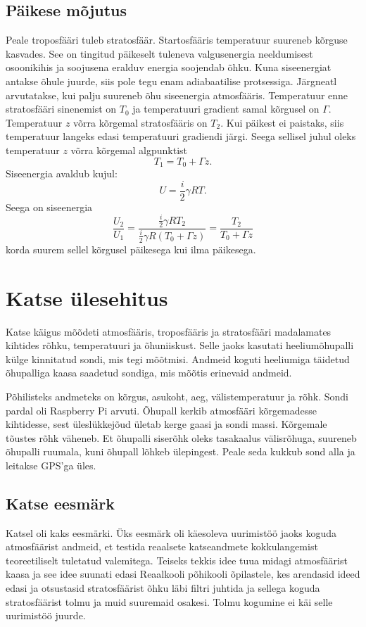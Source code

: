 \documentclass{trkut}%
\begin{document}
\section{Päikese mõjutus}
Peale troposfääri tuleb stratosfäär. Startosfääris temperatuur suureneb kõrguse kasvades. See on tingitud päikeselt tuleneva valgusenergia neeldumisest osoonikihis ja soojusena eralduv energia soojendab õhku. Kuna siseenergiat antakse õhule juurde, siis pole tegu enam adiabaatilise protsessiga. Järgneatl arvutatakse, kui palju suureneb õhu siseenergia atmosfääris. Temperatuur enne stratosfääri sinenemist on $T_0$ ja temperatuuri gradient samal kõrgusel on $\Gamma$. Temperatuur $z$ võrra kõrgemal stratosfääris on $T_2$. Kui päikest ei paistaks, siis temperatuur langeks edasi temperatuuri gradiendi järgi. Seega sellisel juhul oleks temperatuur $z$ võrra kõrgemal algpunktist
\begin{equation*}
T_1 = T_0 + \Gamma z.
\end{equation*}
Siseenergia avaldub kujul:
\begin{equation*}
U = \frac{i}{2}\gamma RT.
\end{equation*}
Seega on siseenergia 
\begin{equation*}
\frac{U_2}{U_1} = \frac{\frac{i}{2}\gamma RT_2}{\frac{i}{2}\gamma R\left(T_0 + \Gamma z\right)} = \frac{T_2}{T_0+\Gamma z}
\end{equation*}
korda suurem sellel kõrgusel päikesega kui ilma päikesega.





\chapter{Katse ülesehitus}
Katse käigus mõõdeti atmosfääris, troposfääris ja stratosfääri madalamates kihtides rõhku, temperatuuri ja õhuniiskust. Selle jaoks kasutati heeliumõhupalli külge kinnitatud sondi, mis tegi mõõtmisi. Andmeid koguti heeliumiga täidetud õhupalliga kaasa saadetud sondiga, mis mõõtis erinevaid andmeid.

Põhilisteks andmeteks on kõrgus, asukoht, aeg, välistemperatuur ja rõhk. Sondi pardal oli Raspberry Pi arvuti. Õhupall kerkib atmosfääri kõrgemadesse kihtidesse, sest üleslükkejõud ületab kerge gaasi ja sondi massi. Kõrgemale tõustes rõhk väheneb. Et õhupalli siserõhk oleks tasakaalus välisrõhuga, suureneb õhupalli ruumala, kuni õhupall lõhkeb ülepingest. Peale seda kukkub sond alla ja leitakse GPS'ga üles.


\section{Katse eesmärk}
Katsel oli kaks eesmärki. Üks eesmärk oli käesoleva uurimistöö jaoks koguda atmosfäärist andmeid, et testida reaalsete katseandmete kokkulangemist teoreetiliselt tuletatud valemitega. Teiseks tekkis idee tuua midagi atmosfäärist kaasa ja see idee suunati edasi Reaalkooli põhikooli õpilastele, kes arendasid ideed edasi ja otsustasid stratosfäärist õhku läbi filtri juhtida ja sellega koguda stratosfäärist tolmu ja muid suuremaid osakesi. Tolmu kogumine ei käi selle uurimistöö juurde.
\end{document}
